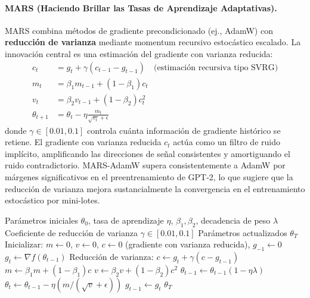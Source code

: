\documentclass[11pt,a4paper]{article}
\begin{document}
\paragraph{MARS (Haciendo Brillar las Tasas de Aprendizaje Adaptativas).}
MARS combina métodos de gradiente precondicionado (ej., AdamW) con \textbf{reducción de varianza} mediante momentum recursivo estocástico escalado. La innovación central es una estimación del gradiente con varianza reducida:
\begin{align}
c_t &= g_t + \gamma(c_{t-1} - g_{t-1}) \quad\text{(estimación recursiva tipo SVRG)} \\
m_t &= \beta_1 m_{t-1} + (1-\beta_1)c_t \\
v_t &= \beta_2 v_{t-1} + (1-\beta_2)c_t^2 \\
\theta_{t+1} &= \theta_t - \eta\frac{m_t}{\sqrt{v_t}+\epsilon}
\end{align}
donde $\gamma \in [0.01, 0.1]$ controla cuánta información de gradiente histórico se retiene. El gradiente con varianza reducida $c_t$ actúa como un filtro de ruido implícito, amplificando las direcciones de señal consistentes y amortiguando el ruido contradictorio. MARS-AdamW supera consistentemente a AdamW por márgenes significativos en el preentrenamiento de GPT-2, lo que sugiere que la reducción de varianza mejora sustancialmente la convergencia en el entrenamiento estocástico por mini-lotes.

\begin{algorithm}[H]
\caption{MARS (Haciendo Brillar las Tasas de Aprendizaje Adaptativas)}
\label{alg:mars}
\begin{algorithmic}[1]
\Require Parámetros iniciales $\theta_0$, tasa de aprendizaje $\eta$, $\beta_1, \beta_2$, decadencia de peso $\lambda$
\Require Coeficiente de reducción de varianza $\gamma \in [0.01, 0.1]$
\Ensure Parámetros actualizados $\theta_T$
\State Inicializar: $m \gets 0$, $v \gets 0$, $c \gets 0$ (gradiente con varianza reducida), $g_{-1} \gets 0$
    \State $g_t \gets \nabla f(\theta_{t-1})$
    \State Reducción de varianza: $c \gets g_t + \gamma(c - g_{t-1})$
    \State $m \gets \beta_1 m + (1-\beta_1) c$
    \State $v \gets \beta_2 v + (1-\beta_2) c^2$
        \State $\theta_{t-1} \gets \theta_{t-1}(1 - \eta\lambda)$
    \EndIf
    \State $\theta_t \gets \theta_{t-1} - \eta (m / (\sqrt{v} + \epsilon))$
    \State $g_{t-1} \gets g_t$
\EndFor
\Return $\theta_T$
\end{algorithmic}
\end{algorithm}
\end{document}
